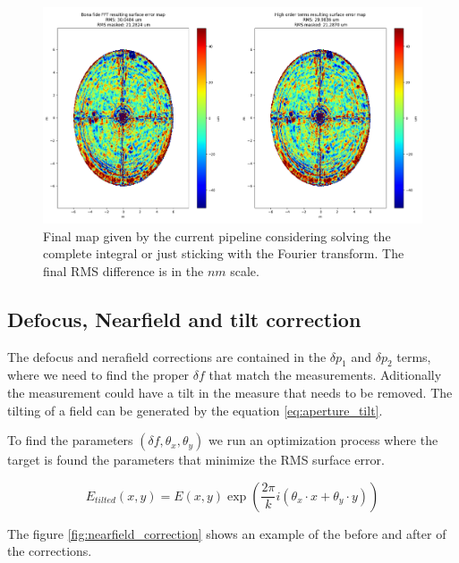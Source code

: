 \begin{figure}
    \centering
    \includegraphics[width=1\textwidth]{images/high_vs_fft_surf_error.png}
    \caption{Final map given by the current pipeline considering solving the complete integral or just sticking with the Fourier transform. The final RMS difference is in the $nm$ scale.}
    \label{fig:high_fft_surf_error}
\end{figure}




\subsection{Defocus, Nearfield and tilt correction}
The defocus and nerafield corrections are contained in the $\delta p_1$ and $\delta p_2$ terms, where we need to find the proper $\delta f$ that match the measurements. Aditionally the measurement could have a tilt in the measure that needs to be removed. The tilting of a field can be generated by the equation \ref{eq:aperture_tilt}.

To find the parameters $(\delta f, \theta_x, \theta_y)$ we run an optimization process where the target is found the parameters that minimize the RMS surface error.

\begin{equation}
    E_{tilted}(x,y) = E(x,y)\exp\left(\frac{2\pi}{k}i\left(\theta_x\cdot x+ \theta_y \cdot y\right)\right)
    \label{eq:aperture_tilt}
\end{equation}


The figure \ref{fig:nearfield_correction} shows an example of the before and after of the corrections.



